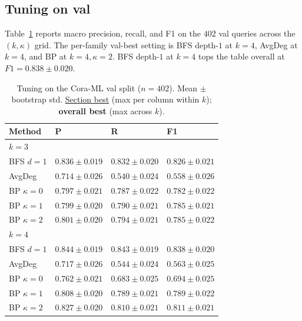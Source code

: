 \documentclass[11pt]{article}
\begin{document}
\subsection{Tuning on val}
\label{sec:tune-val}

Table~\ref{tab:tune-val} reports macro precision, recall, and F1 on the
$402$ val queries across the $(k, \kappa)$ grid. The per-family val-best
setting is BFS depth-$1$ at $k = 4$, AvgDeg at $k = 4$, and BP at
$k = 4, \kappa = 2$. BFS depth-$1$ at $k = 4$ tops the table overall at
$F1 = 0.838 \pm 0.020$.

\begin{table}[t]
\centering
\footnotesize
\caption{Tuning on the Cora-ML val split ($n = 402$). Mean $\pm$
bootstrap std. \underline{Section best} (max per column within $k$);
\textbf{overall best} (max across $k$).}
\label{tab:tune-val}
\begin{tabular}{llll}
\toprule
Method                     & P     & R     & F1 \\
\midrule
\multicolumn{4}{l}{\textit{$k = 3$}} \\
BFS $d = 1$                & \underline{$0.836 \pm 0.019$} & \underline{$0.832 \pm 0.020$} & \underline{$0.826 \pm 0.021$} \\
AvgDeg                     & $0.714 \pm 0.026$ & $0.540 \pm 0.024$ & $0.558 \pm 0.026$ \\
BP $\kappa = 0$            & $0.797 \pm 0.021$ & $0.787 \pm 0.022$ & $0.782 \pm 0.022$ \\
BP $\kappa = 1$            & $0.799 \pm 0.020$ & $0.790 \pm 0.021$ & $0.785 \pm 0.021$ \\
BP $\kappa = 2$            & $0.801 \pm 0.020$ & $0.794 \pm 0.021$ & $0.785 \pm 0.022$ \\
\midrule
\multicolumn{4}{l}{\textit{$k = 4$}} \\
BFS $d = 1$                & \underline{\textbf{$0.844 \pm 0.019$}} & \underline{\textbf{$0.843 \pm 0.019$}} & \underline{\textbf{$0.838 \pm 0.020$}} \\
AvgDeg                     & $0.717 \pm 0.026$ & $0.544 \pm 0.024$ & $0.563 \pm 0.025$ \\
BP $\kappa = 0$            & $0.762 \pm 0.021$ & $0.683 \pm 0.025$ & $0.694 \pm 0.025$ \\
BP $\kappa = 1$            & $0.808 \pm 0.020$ & $0.789 \pm 0.021$ & $0.789 \pm 0.022$ \\
BP $\kappa = 2$            & $0.827 \pm 0.020$ & $0.810 \pm 0.021$ & $0.811 \pm 0.021$ \\

\end{tabular}
\end{table}
\end{document}
